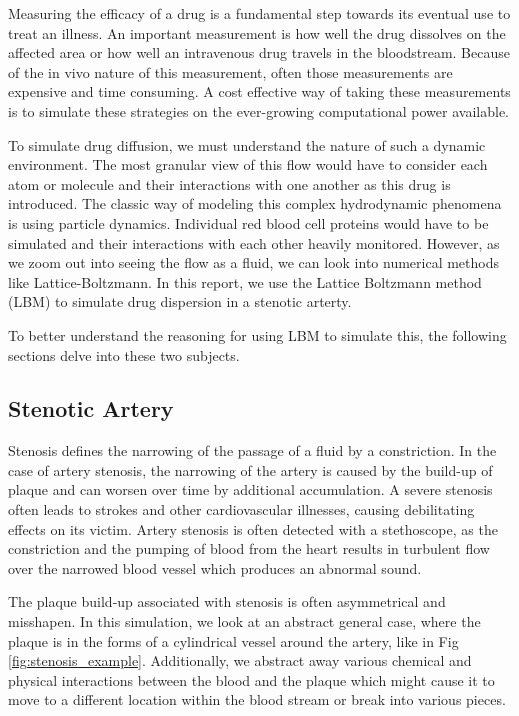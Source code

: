 
Measuring the efficacy of a drug is a fundamental step towards its eventual use to treat an illness. An important measurement is how well the drug dissolves on the affected area or how well an intravenous drug travels in the bloodstream. Because of the in vivo nature of this measurement, often those measurements are expensive and time consuming. A cost effective way of taking these measurements is to simulate these strategies on the ever-growing computational power available. 

To simulate drug diffusion, we must understand the nature of such a dynamic environment. The most granular view of this flow would have to consider each atom or molecule and their interactions with one another as this drug is introduced. The classic way of modeling this complex hydrodynamic phenomena is using particle dynamics. Individual red blood cell proteins would have to be simulated and their interactions with each other heavily monitored. However, as we zoom out into seeing the flow as a fluid, we can look into numerical methods like Lattice-Boltzmann. In this report, we use the Lattice Boltzmann method (LBM) to simulate drug dispersion in a stenotic arterty. 

To better understand the reasoning for using LBM to simulate this, the following sections delve into these two subjects.

\subsection{Stenotic Artery}
Stenosis defines the narrowing of the passage of a fluid by a constriction. In the case of artery stenosis, the narrowing of the artery is caused by the build-up of plaque and can worsen over time by additional accumulation. A severe stenosis often leads to strokes and other cardiovascular illnesses, causing debilitating effects on its victim. Artery stenosis is often detected with a stethoscope, as the constriction and the pumping of blood from the heart results in turbulent flow over the narrowed blood vessel which produces an abnormal sound. 

The plaque build-up associated with stenosis is often asymmetrical and misshapen. In this simulation, we look at an abstract general case, where the plaque is in the forms of a cylindrical vessel around the artery, like in Fig \ref{fig:stenosis_example}. Additionally, we abstract away various chemical and physical interactions between the blood and the plaque which might cause it to move to a different location within the blood stream or break into various pieces. 


